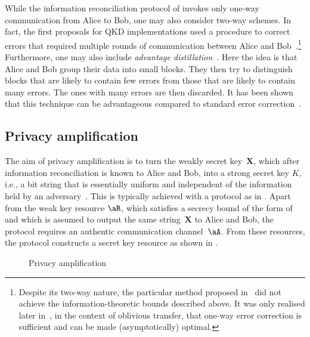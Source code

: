 While the information reconciliation protocol of  invokes only one-way communication from Alice to Bob, one may also consider two-way schemes. In fact, the first proposals for QKD implementations used a procedure to correct errors that required multiple rounds of communication between Alice and Bob~\cite{BBBSS92}.\footnote{Despite its two-way nature, the particular method proposed in~\textcite{BBBSS92} did not achieve the information-theoretic bounds described above. It was only realised later in~\textcite{BBCS92}, in the context of oblivious transfer, that one-way error correction is sufficient and can be made (asymptotically) optimal.} Furthermore, one may also include \emph{advantage distillation}~\cite{Mau93}. Here the idea is that Alice and Bob group their data into small blocks. They then try to distinguish blocks that are likely to contain few errors from those that are likely to contain many errors. The ones with many errors are then discarded. It has been shown that this technique can be advantageous compared to standard error correction~\cite{GL03,Ren05,TLR20}. 



\subsection{Privacy amplification} \label{sec_pa}

The aim of privacy amplification is to turn the weakly secret key~$\mathbf{X}$, which after information reconciliation is known to Alice and Bob, into  a strong secret key $K$, i.e., a bit string that is essentially uniform and independent of the information held by an adversary~\cite{BBR88,BBCM95}. This is typically achieved with a protocol as in  . Apart from the weak key resource $\aR$, which satisfies a secrecy bound of the form of  and which is assumed to output the same string~$\mathbf{X}$ to Alice and Bob,  the protocol requires an authentic communication channel~$\aA$. From these resources, the protocol constructs a secret key resource as shown in .

\begin{figure}[h]
\noindent{}
\caption{Privacy amplification \label{fig:PrivacyAmplification}}
\end{figure}


